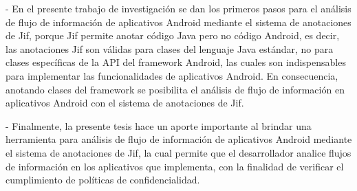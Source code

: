 - En el presente trabajo de investigación se dan los primeros pasos para el
análisis de flujo de información de aplicativos Android mediante el sistema de
anotaciones de Jif, porque Jif permite anotar código Java pero no código
Android, es decir, las anotaciones Jif son válidas para clases del lenguaje Java
estándar, no para clases específicas de la API del framework Android, las cuales
son indispensables para implementar las funcionalidades de aplicativos Android.
En consecuencia, anotando clases del framework se posibilita el análisis de
flujo de información en aplicativos Android con el sistema de anotaciones de Jif.

- Finalmente, la presente tesis hace un aporte importante al brindar una
herramienta para análisis de flujo de información de aplicativos Android
mediante el sistema de anotaciones de Jif, la cual permite que el desarrollador
analice flujos de información en los aplicativos que implementa, con la
finalidad de verificar el cumplimiento de políticas de confidencialidad.

% 




% 

